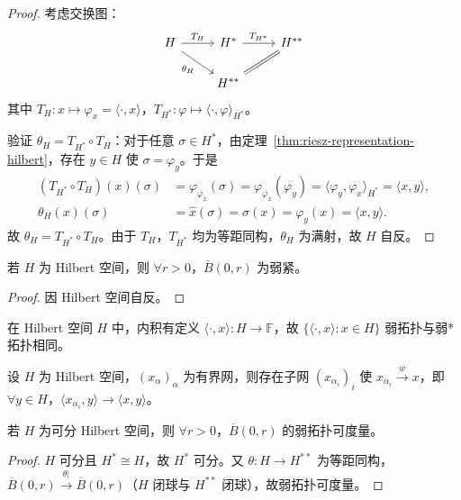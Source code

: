 \documentclass[lang=cn,a4paper,newtx,section]{elegantbook}
\begin{document}
\begin{proof}
  考虑交换图：
  \[
    \begin{tikzcd}
      H \arrow[r,"T_H"] \arrow[dr,"\theta_H"'] & H^* \arrow[r,"T_{H^*}"] & H^{**} \\
      & H^{**} \arrow[ur,equal]
    \end{tikzcd}
  \]
  其中 $T_H:x\mapsto\varphi_x=\langle\cdot,x\rangle$，$T_{H^*}:\varphi\mapsto\langle\cdot,\varphi\rangle_{H^*}$。

  验证 $\theta_H=T_{H^*}\circ T_H$：对于任意 $\sigma\in H^*$，由定理~\ref{thm:riesz-representation-hilbert}，存在 $y\in H$ 使 $\sigma=\varphi_y$。于是
  \begin{align*}
    (T_{H^*}\circ T_H)(x)(\sigma)&=\varphi_{\varphi_x}(\sigma)=\varphi_{\varphi_x}(\varphi_y)=\langle\varphi_y,\varphi_x\rangle_{H^*}=\langle x,y\rangle,\\
    \theta_H(x)(\sigma)&=\hat{x}(\sigma)=\sigma(x)=\varphi_y(x)=\langle x,y\rangle.
  \end{align*}
  故 $\theta_H=T_{H^*}\circ T_H$。由于 $T_H$，$T_{H^*}$ 均为等距同构，$\theta_H$ 为满射，故 $H$ 自反。
\end{proof}

\begin{theorem}
  若 $H$ 为 Hilbert 空间，则 $\forall r>0$，$\overline{B}(0,r)$ 为弱紧。
\end{theorem}

\begin{proof}
  因 Hilbert 空间自反。
\end{proof}

\begin{remark}
  在 Hilbert 空间 $H$ 中，内积有定义 $\langle\cdot,x\rangle:H\to\mathbb{F}$，故 $\{\langle\cdot,x\rangle:x\in H\}$ 弱拓扑与弱*拓扑相同。
\end{remark}

\begin{corollary}
  设 $H$ 为 Hilbert 空间，$(x_\alpha)_\alpha$ 为有界网，则存在子网 $(x_{\alpha_i})_i$ 使 $x_{\alpha_i}\xrightarrow{w}x$，即 $\forall y\in H$，$\langle x_{\alpha_i},y\rangle\to\langle x,y\rangle$。
\end{corollary}

\begin{theorem}
  若 $H$ 为可分 Hilbert 空间，则 $\forall r>0$，$\overline{B}(0,r)$ 的弱拓扑可度量。
\end{theorem}

\begin{proof}
  $H$ 可分且 $H^*\cong H$，故 $H^*$ 可分。又 $\theta:H\to H^{**}$ 为等距同构，$\overline{B}(0,r)\xrightarrow{\theta|}\overline{B}(0,r)$（$H$ 闭球与 $H^{**}$ 闭球），故弱拓扑可度量。
\end{proof}
\end{document}
